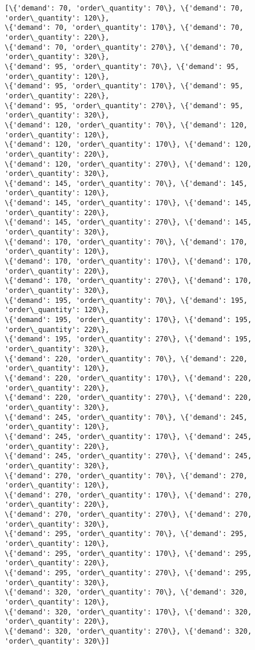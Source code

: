 \documentclass[11pt]{article}
\begin{document}
    \begin{Verbatim}[commandchars=\\\{\}]
[\{'demand': 70, 'order\_quantity': 70\}, \{'demand': 70, 'order\_quantity': 120\},
\{'demand': 70, 'order\_quantity': 170\}, \{'demand': 70, 'order\_quantity': 220\},
\{'demand': 70, 'order\_quantity': 270\}, \{'demand': 70, 'order\_quantity': 320\},
\{'demand': 95, 'order\_quantity': 70\}, \{'demand': 95, 'order\_quantity': 120\},
\{'demand': 95, 'order\_quantity': 170\}, \{'demand': 95, 'order\_quantity': 220\},
\{'demand': 95, 'order\_quantity': 270\}, \{'demand': 95, 'order\_quantity': 320\},
\{'demand': 120, 'order\_quantity': 70\}, \{'demand': 120, 'order\_quantity': 120\},
\{'demand': 120, 'order\_quantity': 170\}, \{'demand': 120, 'order\_quantity': 220\},
\{'demand': 120, 'order\_quantity': 270\}, \{'demand': 120, 'order\_quantity': 320\},
\{'demand': 145, 'order\_quantity': 70\}, \{'demand': 145, 'order\_quantity': 120\},
\{'demand': 145, 'order\_quantity': 170\}, \{'demand': 145, 'order\_quantity': 220\},
\{'demand': 145, 'order\_quantity': 270\}, \{'demand': 145, 'order\_quantity': 320\},
\{'demand': 170, 'order\_quantity': 70\}, \{'demand': 170, 'order\_quantity': 120\},
\{'demand': 170, 'order\_quantity': 170\}, \{'demand': 170, 'order\_quantity': 220\},
\{'demand': 170, 'order\_quantity': 270\}, \{'demand': 170, 'order\_quantity': 320\},
\{'demand': 195, 'order\_quantity': 70\}, \{'demand': 195, 'order\_quantity': 120\},
\{'demand': 195, 'order\_quantity': 170\}, \{'demand': 195, 'order\_quantity': 220\},
\{'demand': 195, 'order\_quantity': 270\}, \{'demand': 195, 'order\_quantity': 320\},
\{'demand': 220, 'order\_quantity': 70\}, \{'demand': 220, 'order\_quantity': 120\},
\{'demand': 220, 'order\_quantity': 170\}, \{'demand': 220, 'order\_quantity': 220\},
\{'demand': 220, 'order\_quantity': 270\}, \{'demand': 220, 'order\_quantity': 320\},
\{'demand': 245, 'order\_quantity': 70\}, \{'demand': 245, 'order\_quantity': 120\},
\{'demand': 245, 'order\_quantity': 170\}, \{'demand': 245, 'order\_quantity': 220\},
\{'demand': 245, 'order\_quantity': 270\}, \{'demand': 245, 'order\_quantity': 320\},
\{'demand': 270, 'order\_quantity': 70\}, \{'demand': 270, 'order\_quantity': 120\},
\{'demand': 270, 'order\_quantity': 170\}, \{'demand': 270, 'order\_quantity': 220\},
\{'demand': 270, 'order\_quantity': 270\}, \{'demand': 270, 'order\_quantity': 320\},
\{'demand': 295, 'order\_quantity': 70\}, \{'demand': 295, 'order\_quantity': 120\},
\{'demand': 295, 'order\_quantity': 170\}, \{'demand': 295, 'order\_quantity': 220\},
\{'demand': 295, 'order\_quantity': 270\}, \{'demand': 295, 'order\_quantity': 320\},
\{'demand': 320, 'order\_quantity': 70\}, \{'demand': 320, 'order\_quantity': 120\},
\{'demand': 320, 'order\_quantity': 170\}, \{'demand': 320, 'order\_quantity': 220\},
\{'demand': 320, 'order\_quantity': 270\}, \{'demand': 320, 'order\_quantity': 320\}]
    \end{Verbatim}
\end{document}
